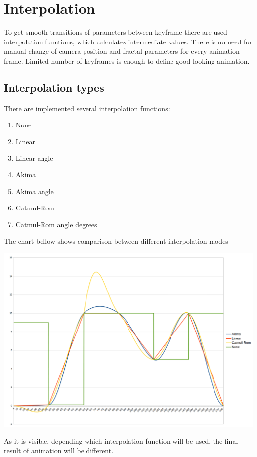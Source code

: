 \section{Interpolation}\label{interpolation}

To get smooth transitions of parameters between keyframe there are used
interpolation functions, which calculates intermediate values. There is no need
for manual change of camera position and fractal parameters for every animation
frame. Limited number of keyframes is enough to define good looking animation.

\subsection{Interpolation types}\label{interpolation-types}

There are implemented several interpolation functions:

\begin{enumerate}
	
	\item None
	
	\item Linear
	
	\item Linear angle
	
	\item Akima
	
	\item Akima angle
	
	\item Catmul-Rom
	
	\item Catmul-Rom angle degrees
	
\end{enumerate}

\begin{samepage}
	
	The chart bellow shows comparison between different interpolation modes
	
	\includegraphics[width=1.0\linewidth]{img/manual/media/interpolations}
	
	As it is visible, depending which interpolation function will be used, the
	final result of animation will be different.
	
\end{samepage}

